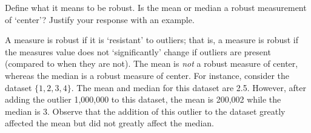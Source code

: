 \documentclass[11pt,letterpaper]{article}
\begin{document}
\newpage



 Define what it means to be robust. Is the mean or median a robust measurement of `center'? Justify your response with an example. \pspace

\sol A measure is robust if it is `resistant' to outliers; that is, a measure is robust if the measures value does not `significantly' change if outliers are present (compared to when they are not). The mean is \textit{not} a robust measure of center, whereas the median is a robust measure of center. For instance, consider the dataset $\{ 1, 2, 3, 4 \}$. The mean and median for this dataset are 2.5. However, after adding the outlier 1,000,000 to this dataset, the mean is 200,002 while the median is 3. Observe that the addition of this outlier to the dataset greatly affected the mean but did not greatly affect the median. 
\end{document}
